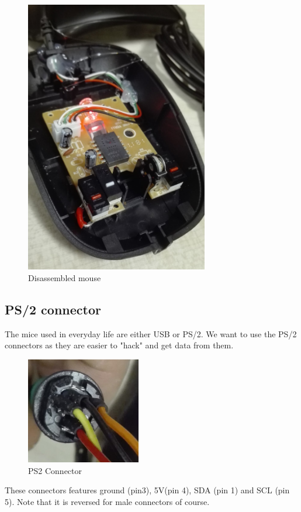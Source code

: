 \documentclass[a4paper]{article}
\begin{document}
\begin{figure}[h!]
    \centering
    \includegraphics[width = 8cm]{images/mouse.jpg}
    \caption{Disassembled mouse}
    \label{fig:mouse}
\end{figure}

\subsection{PS/2 connector}
The mice used in everyday life are either USB or PS/2.
We want to use the PS/2 connectors as they are easier to "hack" and get data from them.

\begin{figure}[h!]
    \centering
    \includegraphics[width = 5cm]{images/ps2.jpg}
    \caption{PS2 Connector}
    \label{fig:connector}
\end{figure}


These connectors features ground (pin3), 5V(pin 4), SDA (pin 1) and SCL (pin 5).
Note that it is reversed for male connectors of course.
\end{document}
